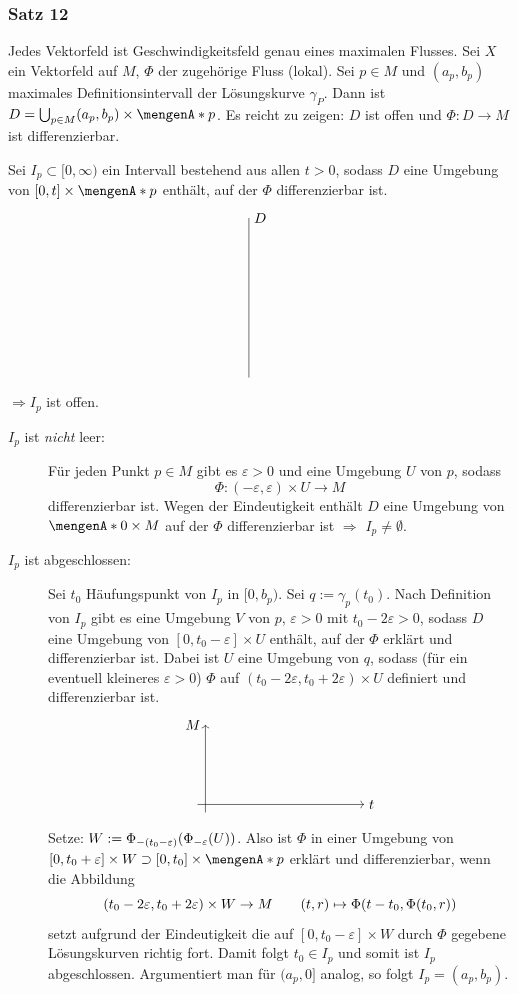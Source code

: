 \subsubsection{Satz 12} %
\label{ssub:2510}
Jedes Vektorfeld ist Geschwindigkeitsfeld genau eines maximalen Flusses.
Sei $X$ ein Vektorfeld auf $M$, $\Phi $ der zugehörige Fluss (lokal). Sei $p \in M$ und $(a_p, b_p)$ maximales Definitionsintervall der Lösungskurve $\gamma_P$.
Dann ist $D = \bigcup_{p \in M} (a_p, b_p) \times \set{p}$. Es reicht zu zeigen: $D$ ist offen und $\Phi : D \to M$ ist differenzierbar.

Sei $I_p \subset [0,\infty)$ ein Intervall bestehend aus allen $t>0$, sodass $D$ eine Umgebung von $[0,t] \times \set{p}$ enthält, auf der $\Phi $ differenzierbar ist.
\[
	\begin{tikzpicture}
		\draw (0,0) -- (0,4) node[right]{$D$};
	\end{tikzpicture}
\]
$\Rightarrow I_p$ ist offen.  
\begin{description}
	\item[$I_p$ ist \emph{nicht} leer:] Für jeden Punkt $p \in M$ gibt es $\varepsilon >0$ und eine Umgebung $U$ von $p$, sodass 
	\[
		\Phi  : (-\varepsilon, \varepsilon)\times U \to M
	\]
	differenzierbar ist. Wegen der Eindeutigkeit enthält $D$ eine Umgebung von $\set{0} \times M $ auf der $\Phi$ differenzierbar ist $\Rightarrow $ $I_p \not= \emptyset$.
	\item[$I_p$ ist abgeschlossen:] Sei $t_0$ Häufungspunkt von $I_p$ in $[0,b_p)$. Sei $q := \gamma_p(t_0)$. Nach Definition von $I_p$ gibt es eine Umgebung $V$ von $p$,
	$\varepsilon >0$ mit $t_0- 2 \varepsilon >0$, sodass $D$ eine Umgebung von $[0,t_0-\varepsilon] \times U$ enthält, auf der $\Phi$ erklärt und differenzierbar ist.
	Dabei ist $U$ eine Umgebung von $q$, sodass (für ein eventuell kleineres $\varepsilon>0$) $\Phi $ auf $(t_0 - 2 \varepsilon, t_0 + 2 \varepsilon) \times U$ definiert
	und differenzierbar ist.
	\[
		\begin{tikzpicture}
			\draw[->] (-0.2,0) -- (4,0) node[right]{$t$};
			\draw[->] (0,-0.2) -- (0,2) node[left]{$M$};
		\end{tikzpicture}
	\]
	Setze: $W := \Phi_{-(t_0-\varepsilon)} \enbrace*{\Phi _{-\varepsilon} (U)} $. Also ist $\Phi$ in einer Umgebung von 
	$[0,t_0+\varepsilon] \times W \supset [0,t_0] \times \set{p}$ erklärt und differenzierbar, wenn die Abbildung 
	\[
		(t_0 - 2 \varepsilon, t_0 + 2 \varepsilon) \times  W \to M \qquad (t,r) \mapsto \Phi  \enbrace*{t-t_0, \Phi(t_0,r)} 
	\]
	setzt aufgrund der Eindeutigkeit die auf $[0,t_0 -\varepsilon] \times W$ durch $\Phi $ gegebene Lösungskurven richtig fort. Damit folgt $t_0 \in I_p$ und somit ist
	$I_p$ abgeschlossen. Argumentiert man für $(a_p,0]$ analog, so folgt $I_p = (a_p, b_p)$. \bewende
\end{description}
\newpage

